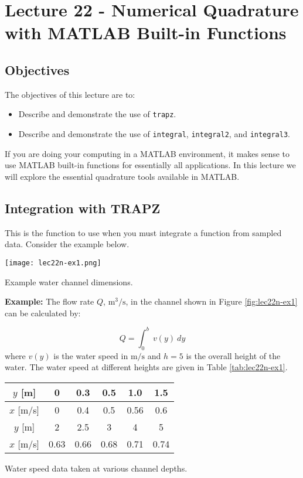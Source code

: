 \chapter{Lecture 22 - Numerical Quadrature with MATLAB Built-in Functions}
\label{ch:lec22n}
\section{Objectives}
The objectives of this lecture are to:
\begin{itemize}
\item Describe and demonstrate the use of \lstinline[style=myMatlab]{trapz}.
\item Describe and demonstrate the use of \lstinline[style=myMatlab]{integral}, \lstinline[style=myMatlab]{integral2}, and \lstinline[style=myMatlab]{integral3}.
\end{itemize}
\setcounter{lstannotation}{0}

If you are doing your computing in a MATLAB environment, it makes sense to use MATLAB built-in functions for essentially all applications.  In this lecture we will explore the essential quadrature tools available in MATLAB.

\section{Integration with TRAPZ}
This is the function to use when you must integrate a function from sampled data.  Consider the example below.

\begin{marginfigure}
\texttt{[image: lec22n-ex1.png]}
\caption{Example water channel dimensions.}
\label{fig:lec22n-ex1}
\end{marginfigure}

\vspace{0.25cm}

\noindent\textbf{Example:} The flow rate $Q$, $\text{m}^3/\text{s}$, in the channel shown in Figure \ref{fig:lec22n-ex1} can be calculated by:

\begin{equation*}
Q = \int_{0}^{b} \ v(y) \ dy
\end{equation*}
where $v(y)$ is the water speed in $\text{m}/\text{s}$ and $h=5$ is the overall height of the water.  The water speed at different heights are given in Table \ref{tab:lec22n-ex1}.
\begin{margintable}
\begin{tabular}{|c|c|c|c|c|c|}
\hline
$y$ [m] & 0 & 0.3 & 0.5 & 1.0 & 1.5 \\ \hline
$x$ [m/s] & 0 & 0.4 & 0.5 & 0.56 & 0.6 \\ \hline
$y$ [m] & 2 & 2.5 & 3 & 4 & 5 \\ \hline
$x$ [m/s] & 0.63 & 0.66 & 0.68 & 0.71 & 0.74 \\ \hline
\end{tabular}
\caption{Water speed data taken at various channel depths.}
\label{tab:lec22n-ex1}
\end{margintable}

